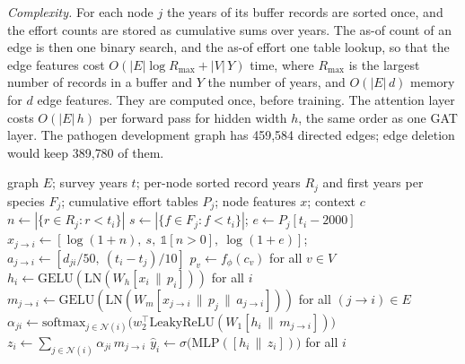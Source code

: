 \documentclass[a4paper,fleqn]{cas-sc}
\newcommand{\Masof}{\mbox{EcoPE-GAT\textsubscript{as-of}}}
\begin{document}
\begin{itemize}[leftmargin=1.4em]
\textit{Complexity.} For each node $j$ the years of its buffer records are sorted once, and the effort counts are stored as cumulative sums over years. The as-of count of an edge is then one binary search, and the as-of effort one table lookup, so that the edge features cost $O(|E| \log R_{\max} + |V|\,Y)$ time, where $R_{\max}$ is the largest number of records in a buffer and $Y$ the number of years, and $O(|E|\,d)$ memory for $d$ edge features. They are computed once, before training. The attention layer costs $O(|E|\,h)$ per forward pass for hidden width $h$, the same order as one GAT layer. The pathogen development graph has 459{,}584 directed edges; edge deletion would keep 389{,}780 of them.

\begin{algorithm}[t]
\caption{As-of message passing in \Masof{} (one forward pass; pathogen features, pests use the analogous variables of Section~\ref{sec:dataset}).}
\label{alg:asof}
\begin{algorithmic}[1]
\Require graph $E$; survey years $t$; per-node sorted record years $R_j$ and first years per species $F_j$; cumulative effort tables $P_j$; node features $x$; context $c$
 
  \State $n \gets |\{r \in R_j : r < t_i\}|$ 
  \State $s \gets |\{f \in F_j : f < t_i\}|$; \quad $e \gets P_j[t_i - 2000]$
  \State $x_{j \to i} \gets [\log(1+n),\ s,\ \mathbb{1}[n>0],\ \log(1+e)]$; \quad $a_{j \to i} \gets [d_{ji}/50,\ (t_i - t_j)/10]$
\EndFor
\State $p_v \gets f_\phi(c_v)$ for all $v \in V$ 
\State $h_i \gets \mathrm{GELU}(\mathrm{LN}(W_h [x_i \,\|\, p_i]))$ for all $i$
\State $m_{j \to i} \gets \mathrm{GELU}(\mathrm{LN}(W_m [x_{j \to i} \,\|\, p_j \,\|\, a_{j \to i}]))$ for all $(j \to i) \in E$
\State $\alpha_{ji} \gets \mathrm{softmax}_{j \in \mathcal{N}(i)}\big(w_2^\top \mathrm{LeakyReLU}(W_1 [h_i \,\|\, m_{j \to i}])\big)$
\State $z_i \gets \sum_{j \in \mathcal{N}(i)} \alpha_{ji}\, m_{j \to i}$
\State \Return $\hat{y}_i \gets \sigma\big(\mathrm{MLP}([h_i \,\|\, z_i])\big)$ for all $i$
\end{algorithmic}
\end{algorithm}


\end{itemize}
\end{document}
